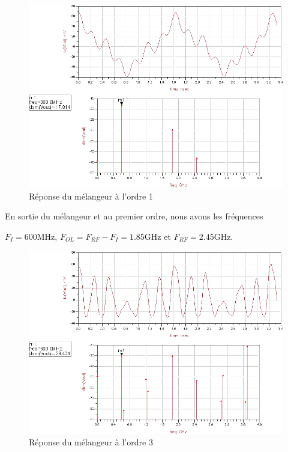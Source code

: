 \documentclass[10pt]{article}
\begin{document}
\begin{figure}
    \begin{center}
        \includegraphics[width=15cm]{p8_simu_1}
    \end{center}
    \caption{Réponse du mélangeur à l’ordre 1}
\end{figure}

En sortie du mélangeur et au premier ordre, nous avons les fréquences 

$F_I=600$MHz, $F_{OL}=F_{RF}-F_I=1.85$GHz et $F_{RF}=2.45$GHz.

\begin{figure}
    \begin{center}
        \includegraphics[width=15cm]{p8_simu_3}
    \end{center}
    \caption{Réponse du mélangeur à l’ordre 3}
\end{figure}
\end{document}
